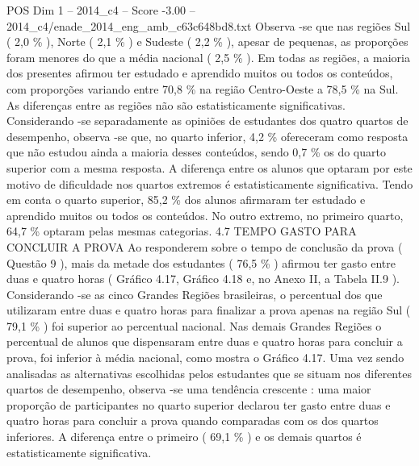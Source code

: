 \begin{textsample}{POS Dim 1 – 2014\_c4 – Score -3.00 – 2014\_c4/enade\_2014\_eng\_amb\_c63c648bd8.txt}
Observa -se que nas regiões Sul ( 2,0 \% ), Norte ( 2,1 \% ) e Sudeste ( 2,2 \% ), apesar de pequenas, as proporções foram menores do que a média nacional ( 2,5 \% ).
Em todas as regiões, a maioria dos presentes afirmou ter estudado e aprendido muitos ou todos os conteúdos, com proporções variando entre 70,8 \% na região Centro-Oeste a 78,5 \% na Sul.
As diferenças entre as regiões não são estatisticamente significativas.
Considerando -se separadamente as opiniões de estudantes dos quatro quartos de desempenho, observa -se que, no quarto inferior, 4,2 \% ofereceram como resposta que não estudou ainda a maioria desses conteúdos, sendo 0,7 \% os do quarto superior com a mesma resposta.
A diferença entre os alunos que optaram por este motivo de dificuldade nos quartos extremos é estatisticamente significativa.
Tendo em conta o quarto superior, 85,2 \% dos alunos afirmaram ter estudado e aprendido muitos ou todos os conteúdos.
No outro extremo, no primeiro quarto, 64,7 \% optaram pelas mesmas categorias. 4.7 TEMPO GASTO PARA CONCLUIR A PROVA Ao responderem sobre o tempo de conclusão da prova ( Questão 9 ), mais da metade dos estudantes ( 76,5 \% ) afirmou ter gasto entre duas e quatro horas ( Gráfico 4.17, Gráfico 4.18 e, no Anexo II, a Tabela II.9 ).
Considerando -se as cinco Grandes Regiões brasileiras, o percentual dos que utilizaram entre duas e quatro horas para finalizar a prova apenas na região Sul ( 79,1 \% ) foi superior ao percentual nacional.
Nas demais Grandes Regiões o percentual de alunos que dispensaram entre duas e quatro horas para concluir a prova, foi inferior à média nacional, como mostra o Gráfico 4.17.
Uma vez sendo analisadas as alternativas escolhidas pelos estudantes que se situam nos diferentes quartos de desempenho, observa -se uma tendência crescente : uma maior proporção de participantes no quarto superior declarou ter gasto entre duas e quatro horas para concluir a prova quando comparadas com os dos quartos inferiores.
A diferença entre o primeiro ( 69,1 \% ) e os demais quartos é estatisticamente significativa.

\end{textsample}
